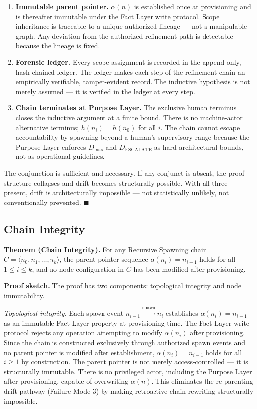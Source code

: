 \begin{enumerate}
    \item[(1)] \textbf{Immutable parent pointer.} $\alpha(n)$ is established once at provisioning and is thereafter immutable under the Fact Layer write protocol. Scope inheritance is traceable to a unique authorized lineage — not a manipulable graph. Any deviation from the authorized refinement path is detectable because the lineage is fixed.
    \item[(2)] \textbf{Forensic ledger.} Every scope assignment is recorded in the append-only, hash-chained ledger. The ledger makes each step of the refinement chain an empirically verifiable, tamper-evident record. The inductive hypothesis is not merely assumed — it is verified in the ledger at every step.
    \item[(3)] \textbf{Chain terminates at Purpose Layer.} The exclusive human terminus closes the inductive argument at a finite bound. There is no machine-actor alternative terminus; $h(n_i) = h(n_0)$ for all $i$. The chain cannot escape accountability by spawning beyond a human's supervisory range because the Purpose Layer enforces $D_{\mathrm{max}}$ and $D_{\mathrm{ESCALATE}}$ as hard architectural bounds, not as operational guidelines.
\end{enumerate}

The conjunction is sufficient and necessary. If any conjunct is absent, the proof structure collapses and drift becomes structurally possible. With all three present, drift is architecturally impossible — not statistically unlikely, not conventionally prevented. $\blacksquare$

\subsection{Chain Integrity}
\label{sec:rs-chain-integrity}

\medskip
\noindent\textbf{Theorem (Chain Integrity).} For any Recursive Spawning chain $C = \langle n_0, n_1, \ldots, n_k \rangle$, the parent pointer sequence $\alpha(n_i) = n_{i-1}$ holds for all $1 \leq i \leq k$, and no node configuration in $C$ has been modified after provisioning.

\medskip
\noindent\textbf{Proof sketch.} The proof has two components: topological integrity and node immutability.

\medskip
\textit{Topological integrity.} Each spawn event $n_{i-1} \xrightarrow{\mathrm{spawn}} n_i$ establishes $\alpha(n_i) = n_{i-1}$ as an immutable Fact Layer property at provisioning time. The Fact Layer write protocol rejects any operation attempting to modify $\alpha(n_i)$ after provisioning. Since the chain is constructed exclusively through authorized spawn events and no parent pointer is modified after establishment, $\alpha(n_i) = n_{i-1}$ holds for all $i \geq 1$ by construction. The parent pointer is not merely access-controlled — it is structurally immutable. There is no privileged actor, including the Purpose Layer after provisioning, capable of overwriting $\alpha(n)$. This eliminates the re-parenting drift pathway (Failure Mode 3) by making retroactive chain rewriting structurally impossible.

